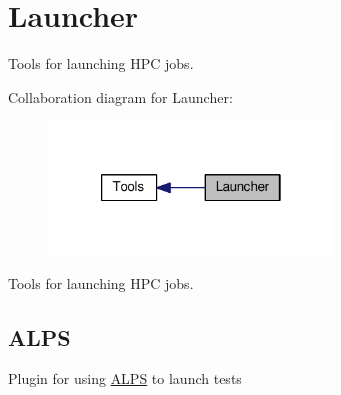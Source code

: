\hypertarget{group___launcher}{\section{Launcher}
\label{group___launcher}
}


Tools for launching H\-P\-C jobs.  


Collaboration diagram for Launcher\-:
\nopagebreak
\begin{figure}[H]
\begin{center}
\leavevmode
\includegraphics[width=214pt]{group___launcher}
\end{center}
\end{figure}
Tools for launching H\-P\-C jobs. \hypertarget{group___launcher_ALPS}{}\subsection{A\-L\-P\-S}\label{group___launcher_ALPS}
Plugin for using \hyperlink{namespace_a_l_p_s}{A\-L\-P\-S} to launch tests 

